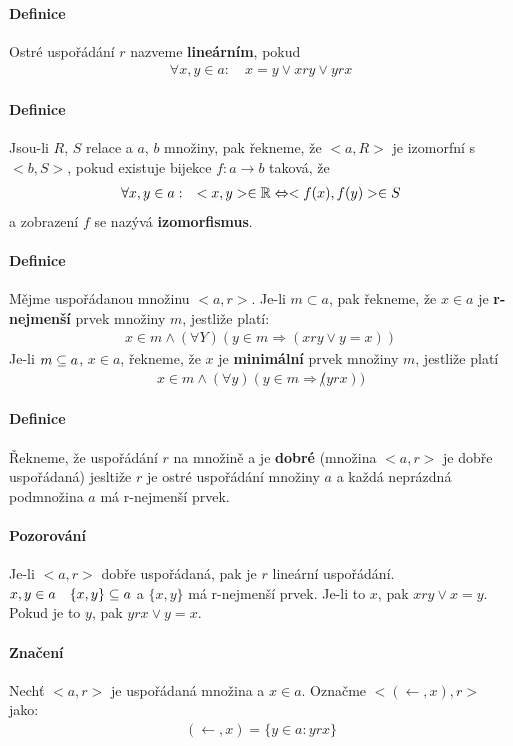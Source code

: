 \documentclass[a4paper,12pt,titlepage]{article}
\begin{document}
\paragraph{Definice}
Ostré uspořádání $r$ nazveme \textbf{lineárním}, pokud 
\begin{align}
	\forall x,y \in a: \quad x = y \lor x r y \lor y r x 
\end{align}
\paragraph{Definice}
Jsou-li $R$, $S$ relace a $a$, $b$ množiny, pak řekneme, že $<a, R>$ je izomorfní
s $<b, S>$, pokud existuje bijekce $f: a\to b$ taková, že
\begin{align}
	\forall x,y \in a: \quad <x,y> \in \mathbb{R} \Leftrightarrow <f(x), f(y)> \in S
\end{align}
a zobrazení $f$ se nazývá \textbf{izomorfismus}.
\paragraph{Definice}
Mějme uspořádanou množinu $<a,r>$. Je-li $m \subset a$, pak řekneme, že $x \in a$
je \textbf{r-nejmenší} prvek množiny $m$, jestliže platí:
\begin{align}
	x \in m \land (\forall Y) (y \in m \Rightarrow (x r y \lor y = x))
\end{align}
Je-li $m \subseteq a$, $x \in a$, řekneme, že $x$ je \textbf{minimální} prvek
množiny $m$,
jestliže platí
\begin{align}
	x \in m \land (\forall y) ( y \in m \Rightarrow \not (y r x))
\end{align}
\paragraph{Definice}
Řekneme, že uspořádání $r$ na množině a je \textbf{dobré} (množina $<a,r>$ je dobře
uspořádaná) jesltiže $r$ je ostré uspořádání množiny $a$ a každá neprázdná
podmnožina $a$ má r-nejmenší prvek.
\paragraph{Pozorování}
Je-li $<a,r>$ dobře uspořádaná, pak je $r$ lineární uspořádání.
$x,y \in a \quad \{x,y\} \subseteq a$ a $\{x,y\}$ má r-nejmenší prvek. Je-li to
$x$,
pak $x r y \lor x = y$. Pokud je to $y$, pak $y r x \lor y = x$.
\paragraph{Značení}
Nechť $<a,r>$ je uspořádaná množina a $x \in a$. Označme $<(\leftarrow, x), r>$
jako:
\begin{align}
	(\leftarrow, x) = \{ y \in a : y r x \}
\end{align}
\end{document}
